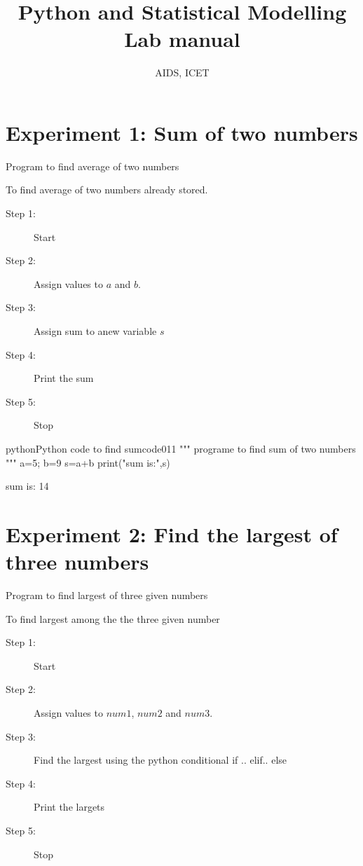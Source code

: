 \documentclass[a4paper]{article}
\title{Python and Statistical Modelling\\ Lab manual}\author{AIDS, ICET}
\begin{document}
\maketitle
\tableofcontents
\newpage
\section{Experiment 1: Sum of two numbers}
\experiment 

Program to find average of two numbers

\dat

\aim

To find average of two numbers already stored.

\algorithm

\begin{description}
\item[Step 1:] Start
\item[Step 2:] Assign values to $a$ and $b$.
\item[Step 3:] Assign sum to anew variable $s$
\item[Step 4:] Print the sum
\item[Step 5:] Stop
\end{description}

\code 

\begin{codeInput}{python}{Python code to find sum}{code01}{1}
"""
programe to find sum of two numbers
"""
a=5; b=9
s=a+b
print("sum is:",s)
\end{codeInput}

\results

\begin{result}
sum is: 14
\end{result}

\section{Experiment 2: Find the largest of three numbers}
\experiment 

Program to find largest of three given numbers

\dat

\aim

To find largest among the the three given number

\algorithm

\begin{description}
\item[Step 1:] Start
\item[Step 2:] Assign values to $num1$, $num2$ and $num3$.
\item[Step 3:] Find the largest using the python conditional {\ttfamily if .. elif.. else}
\item[Step 4:] Print the largets
\item[Step 5:] Stop
\end{description}
\end{document}
